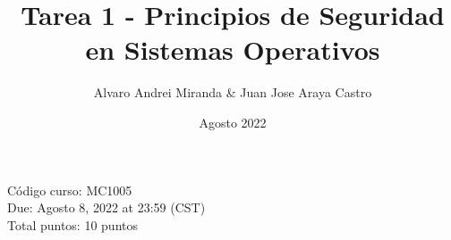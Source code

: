 \documentclass{article}
\title{Tarea 1 - Principios de Seguridad en Sistemas Operativos}
\author{Alvaro Andrei Miranda & Juan Jose Araya Castro}
\date{Agosto 2022}
\begin{document}
\maketitle

\begin{minipage}{\textwidth}
Código curso: MC1005\\
Due: Agosto 8, 2022 at 23:59 (CST)\\
Total puntos: 10 puntos\\
\end{minipage}

    
    
\end{document}
